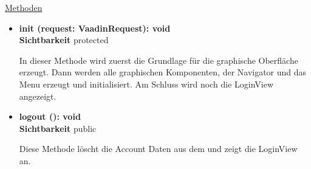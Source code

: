\underline{Methoden}
\begin{itemize}
\itemsep0pt
\item \textbf{init (request: VaadinRequest): void}\hfill\\
\textbf{Sichtbarkeit} protected

In dieser Methode wird zuerst die Grundlage für die graphische Oberfläche erzeugt. Dann werden alle graphischen Komponenten, der Navigator und das Menu erzeugt und initialisiert. Am Schluss wird noch die LoginView angezeigt.

\item \textbf{logout (): void}\hfill\\
\textbf{Sichtbarkeit} public

Diese Methode löscht die Account Daten aus dem  und zeigt die LoginView an.

\end{itemize}
